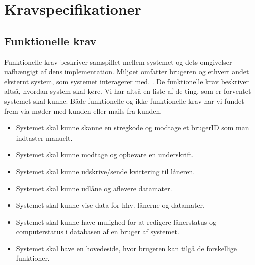 \documentclass[a4paper]{article}
\begin{document}
\section{Kravspecifikationer}
\subsection{Funktionelle krav}
Funktionelle krav beskriver samspillet mellem systemet og dets omgivelser uafhængigt af dens implementation. Miljøet omfatter brugeren og ethvert andet eksternt system, som systemet interagerer med. \cite[p~125]{OOSE}. De funktionelle krav beskriver altså, hvordan system skal køre. Vi har altså en liste af de ting, som er forventet systemet skal kunne. Både funktionelle og ikke-funktionelle krav har vi fundet frem via møder med kunden eller mails fra kunden.
\begin{itemize}
	\item Systemet skal kunne skanne en stregkode og modtage et brugerID som man indtaster manuelt.
	\item Systemet skal kunne modtage og opbevare en underskrift.
	\item Systemet skal kunne udskrive/sende kvittering til låneren.
	\item Systemet skal kunne udlåne og aflevere datamater.
	\item Systemet skal kunne vise data for hhv. lånerne og datamater.
	\item Systemet skal kunne have mulighed for at redigere lånerstatus og computerstatus i databasen af en bruger af systemet.
	\item Systemet skal have en hovedeside, hvor brugeren kan tilgå de forskellige funktioner.
\end{itemize}
\newpage
\end{document}
